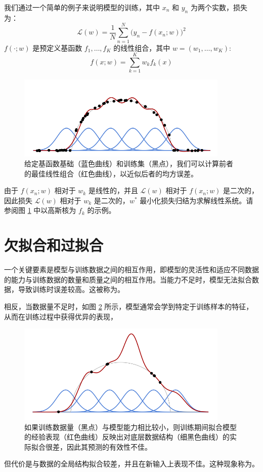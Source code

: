我们通过一个简单的例子来说明模型的训练，其中 $x_n$ 和 $y_n$ 为两个实数，损失为：
\begin{equation}
    \mathcal{L}(w) = \frac{1}{N}\sum_{n=1}^{N}\big(y_n-f(x_n;w)\big)^2\label{eq1.1}
\end{equation}
$f(\cdot;w)$ 是预定义基函数 $f_1, \dots , f_K$ 的线性组合，其中 $w =(w_1, \dots ,w_K)$:
\[f(x;w) = \sum_{k=1}^{K}w_kf_k(x)\]
\begin{figure}
    \centering
    \includegraphics[width=0.9\textwidth]{fig/fig1.1.png}
    \caption[核回归]{给定基函数基础（蓝色曲线）和训练集（黑点），我们可以计算前者的最佳线性组合（红色曲线），以近似后者的均方误差。}
    \label{fig1.1}
\end{figure}
由于 $f(x_n;w)$ 相对于 $w_k$ 是线性的，并且 $\mathcal{L}(w)$ 相对于 $f(x_n;w)$ 是二次的，因此损失 $\mathcal{L}(w)$ 相对于 $w_k$ 是二次的，$w^*$ 最小化损失归结为求解线性系统。请参阅图 \ref{fig1.1} 中以高斯核为 $f_k$ 的示例。

\section{欠拟合和过拟合}\label{sec1.3}

一个关键要素是模型与训练数据之间的相互作用，即模型的灵活性和适应不同数据的能力与训练数据的数量和质量之间的相互作用。当能力不足时，模型无法拟合数据，导致训练时误差较高。这被称为。

相反，当数据量不足时，如图 \ref{fig1.2} 所示，模型通常会学到特定于训练样本的特征，从而在训练过程中获得优异的表现，
\begin{figure}
    \centering
    \includegraphics[width=0.9\textwidth]{fig/fig1.2.png}
    \caption[核回归的过拟合]{如果训练数据量（黑点）与模型能力相比较小，则训练期间拟合模型的经验表现（红色曲线）反映出对底层数据结构（细黑色曲线）的实际拟合很差，因此其预测的有效性不佳。}
    \label{fig1.2}
\end{figure}
但代价是与数据的全局结构拟合较差，并且在新输入上表现不佳。这种现象称为。

